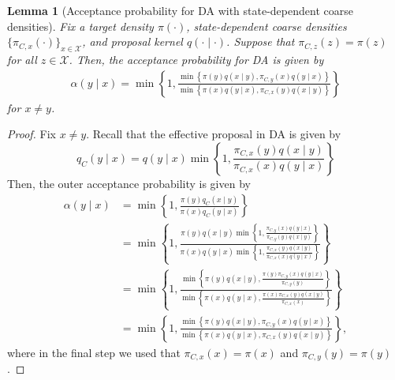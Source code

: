 \documentclass[12pt]{article}
\newtheorem{lemma}[theorem]{Lemma}
\theoremstyle{definition}
\theoremstyle{remark}
\theoremstyle{plain}
\begin{document}
\begin{lemma}[Acceptance probability for DA with state-dependent coarse densities]
Fix a target density $\pi(\cdot)$, state-dependent coarse densities $\{\pi_{C,x}(\cdot)\}_{x \in \mathcal{X}}$, 
and proposal kernel $q(\cdot\mid\cdot)$. Suppose that $\pi_{C,z}(z) = \pi(z)$ for all $z \in \mathcal{X}$.
Then, the acceptance probability for DA is given by
\begin{align*}
  \alpha(y\mid x) = \min\left\{1, \frac{\min\left\{\pi(y)q(x\mid y), \pi_{C,y}(x)q(y\mid x)\right\}}{\min\left\{\pi(x)q(y\mid x), \pi_{C,x}(y)q(x\mid y)\right\}}\right\}
\end{align*}
for $x \neq y$.
\end{lemma}
\begin{proof}
Fix $x \neq y$. 
Recall that the effective proposal in DA is given by 
\[
  q_C(y\mid x) = q(y\mid x)\min\left\{1, \frac{\pi_{C,x}(y)q(x\mid y)}{\pi_{C,x}(x)q(y\mid x)}\right\}
\]
Then, the outer acceptance probability is given by
\begin{align*}
  \alpha(y\mid x) 
  &= \min\left\{1, \frac{\pi(y)q_C(x\mid y)}{\pi(x)q_C(y\mid x)}\right\} \\
  &= \min\left\{1, \frac{\pi(y)q(x\mid y)\min\left\{1, \frac{\pi_{C,y}(x)q(y\mid x)}{\pi_{C,y}(y)q(x\mid y)}\right\}}{\pi(x)q(y\mid x)\min\left\{1, \frac{\pi_{C,x}(y)q(x\mid y)}{\pi_{C,x}(x)q(y\mid x)}\right\}}\right\} \\
  &= \min\left\{1, \frac{\min\left\{\pi(y)q(x\mid y), \frac{\pi(y)\pi_{C,y}(x)q(y\mid x)}{\pi_{C,y}(y)}\right\}}{\min\left\{\pi(x)q(y\mid x), \frac{\pi(x)\pi_{C,x}(y)q(x\mid y)}{\pi_{C,x}(x)}\right\}}\right\}\\
  &= \min\left\{1, \frac{\min\left\{\pi(y)q(x\mid y), \pi_{C,y}(x)q(y\mid x)\right\}}{\min\left\{\pi(x)q(y\mid x), \pi_{C,x}(y)q(x\mid y)\right\}}\right\},
\end{align*}
where in the final step we used that $\pi_{C, x}(x) = \pi(x)$ and $\pi_{C, y}(y) = \pi(y)$.


\end{proof}
\end{document}
